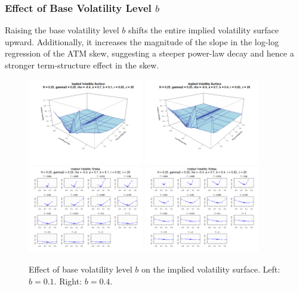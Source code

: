 \subsubsection*{Effect of Base Volatility Level $b$}
\begin{minipage}{\textwidth}
Raising the base volatility level $b$ shifts the entire implied volatility surface upward. Additionally, it increases the magnitude of the slope in the log-log regression of the ATM skew, suggesting a steeper power-law decay and hence a stronger term-structure effect in the skew.
\begin{figure}[H]
    \centering
    \includegraphics[width=0.45\textwidth]{figures/5.2 Individual Parameter Effects/b=0.1_iv_surface.png}
	\includegraphics[width=0.45\textwidth]{figures/5.2 Individual Parameter Effects/b=0.4_iv_surface.png}
	\includegraphics[width=0.45\textwidth]{figures/5.2 Individual Parameter Effects/b=0.1_iv_smiles.png}
	\includegraphics[width=0.45\textwidth]{figures/5.2 Individual Parameter Effects/b=0.4_iv_smiles.png}
    \caption{Effect of base volatility level $b$ on the implied volatility surface. Left: $b=0.1$. Right: $b=0.4$.}
    \label{fig:b_effect}
\end{figure}
\end{minipage}

